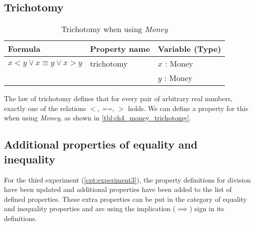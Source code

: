 \subsection*{Trichotomy}
\label{ssct:properties_trichotomy}
\begin{table}[!ht]
\centering
\begin{tabular}{lll}
\hline
                        \textbf{Formula}                   & \textbf{Property name} & \textbf{Variable (Type)} \\ \hline
\rowcolor[HTML]{EFEFEF} $x < y \lor x \equiv y \lor x > y$ & trichotomy             & $x$ : Money              \\
\rowcolor[HTML]{EFEFEF}                                    &                        & $y$ : Money              \\ \hline
\end{tabular}
\caption{Trichotomy when using \textit{Money}}
\label{tbl:ch4_money_trichotomy}
\end{table}
\FloatBarrier\noindent
The law of trichotomy defines that for every pair of arbitrary real numbers,
exactly one of the relations \textit{$<$}, \textit{==}, \textit{$>$} holds. We
can define a property for this when using \textit{Money}, as shown in
\autoref{tbl:ch4_money_trichotomy}.
\clearpage %
\subsection{Additional properties of equality and inequality}
\label{ssct:properties_definitions_additionalproperties}
For the third experiment (\autoref{cpt:experiment3}), the property definitions for division have been updated and additional properties have
been added to the list of defined properties. These extra properties can be put in the category of equality and
inequality properties and are using the implication ($\implies$) sign in its
definitions.

